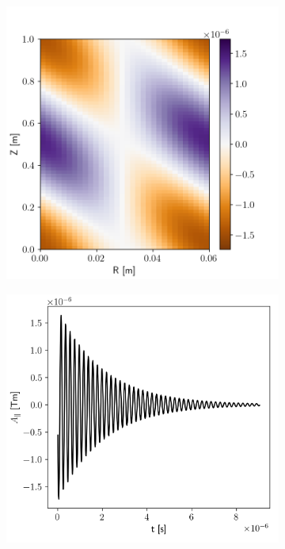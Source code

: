 \begin{figure}[H]
	\centering
	\begin{subfigure}[b]{0.45\textwidth}
		\centering
		\includegraphics[width=.98\textwidth]{schemes/44_APara.png}
		\label{fig:electromagneticSLAB_initialProfile_A}
	\end{subfigure}
	\begin{subfigure}[b]{0.45\textwidth}
		\centering
		\includegraphics[width=1\textwidth]{schemes/excitedSLAB_2D_timeplot_A.png}

\end{subfigure}
\end{figure}
